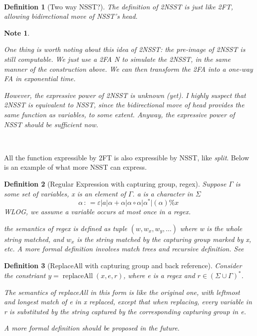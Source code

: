 \documentclass[sigplan,review,anonymous]{acmart}\settopmatter{printfolios=true,printccs=false,printacmref=false}
\newcommand{\colons}{\,:\,}
\newcommand{\tmop}[1]{\ensuremath{\operatorname{#1}}}
\newcommand{\tmtextit}[1]{{\itshape{#1}}}
\newtheorem{definition}{Definition}
\newtheorem{note}{Note}
\begin{document}
\

\begin{definition}[Two way NSST?]
  The definition of 2NSST is just like 2FT, allowing bidirectional move of
  NSST's head.
\end{definition}

\begin{note}
  \
  
  One thing is worth noting about this idea of 2NSST: \tmtextit{the pre-image
  of 2NSST is still computable}. We just use a 2FA N to simulate the 2NSST, in
  the same manner of the construction above. We can then transform the 2FA
  into a one-way FA in exponential time.
  
  However, the expressive power of 2NSST is unknown (yet). I highly suspect
  that 2NSST is equivalent to NSST, since the bidirectional move of head
  provides the same function as variables, to some extent. Anyway, the
  expressive power of NSST should be sufficient now.
\end{note}

\

All the function expressible by 2FT is also expressible by NSST, like
\tmtextit{split}. Below is an example of what more NSST can express.

\begin{definition}[Regular Expression with capturing group, regex]
  Suppose $\Gamma$ is some set of variables, x is an element of $\Gamma$. a is
  a character in $\Sigma$
  \[ \alpha \colons = \varepsilon |a| \alpha + \alpha | \alpha \circ \alpha |
     \alpha^{\ast} | (\alpha) \%x \]
  WLOG, we assume a variable occurs at most once in a regex.
  
  the semantics of regex is defined as tuple $(w, w_x, w_y, \ldots)$ where w
  is the whole string matched, and $w_x$ is the string matched by the
  capturing group marked by x, etc. A more formal definition involves match
  trees and recursive definition.
  See{\cite{CSY03,CN09}}
\end{definition}

\begin{definition}[ReplaceAll with capturing group and back reference]
  Consider the constriant $y = \tmop{replaceAll} (x, e, r)$, where e is a
  regex and $r \in (\Sigma \cup \Gamma)^{\ast}$.
  
  The semantics of replaceAll in this form is like the original
  one{\cite{CCH+18}}, with leftmost and longest match of
  e in x replaced, except that when replacing, every variable in r is
  substituted by the string captured by the corresponding capturing group in
  e.
  
  A more formal definition should be proposed in the future.
\end{definition}
\end{document}
